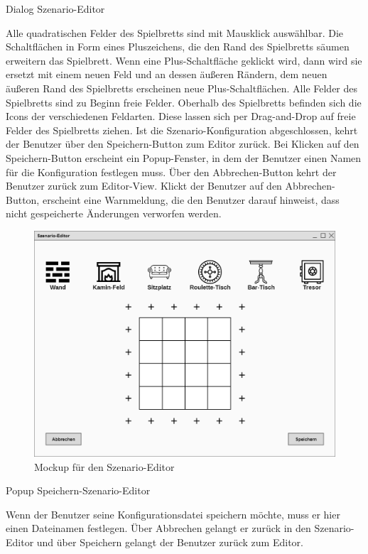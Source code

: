 Dialog \glqq{}Szenario-Editor\grqq{}

Alle quadratischen Felder des Spielbretts sind mit Mausklick auswählbar. Die Schaltflächen in Form eines Pluszeichens, die den Rand des Spielbretts säumen erweitern das Spielbrett. Wenn eine Plus-Schaltfläche geklickt wird, dann wird sie ersetzt mit einem neuen Feld und an dessen äußeren Rändern, dem neuen äußeren Rand des Spielbretts erscheinen neue Plus-Schaltflächen. Alle Felder des Spielbretts sind zu Beginn freie Felder. Oberhalb des Spielbretts befinden sich die Icons der verschiedenen Feldarten. Diese lassen sich per Drag-and-Drop auf freie Felder des Spielbretts ziehen. Ist die Szenario-Konfiguration abgeschlossen, kehrt der Benutzer über den Speichern-Button zum Editor zurück. Bei Klicken auf den Speichern-Button erscheint ein Popup-Fenster, in dem der Benutzer einen Namen für die Konfiguration festlegen muss. Über den Abbrechen-Button kehrt der Benutzer zurück zum Editor-View. Klickt der Benutzer auf den Abbrechen-Button, erscheint eine Warnmeldung, die den Benutzer darauf hinweist, dass nicht gespeicherte Änderungen verworfen werden.

\begin{figure}
  \centering
  \includegraphics[width=\textwidth]{Meilenstein03/Szenario-Editor_Mockup.png}
  \caption{Mockup für den Szenario-Editor}
\end{figure}

Popup \glqq{}Speichern-Szenario-Editor\grqq{}

Wenn der Benutzer seine Konfigurationsdatei speichern möchte, muss er hier einen Dateinamen festlegen. Über Abbrechen gelangt er zurück in den Szenario-Editor und über Speichern gelangt der Benutzer zurück zum Editor.

